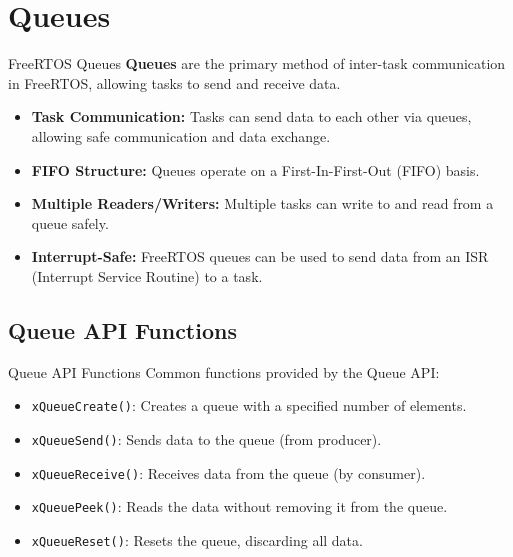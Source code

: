 \documentclass[10pt]{beamer}
\begin{document}
\section{Queues}
\begin{frame}{FreeRTOS Queues}
    \textbf{Queues} are the primary method of inter-task communication in FreeRTOS, allowing tasks to send and receive data.
    
    \begin{itemize}
        \item \textbf{Task Communication:} Tasks can send data to each other via queues, allowing safe communication and data exchange.
        \item \textbf{FIFO Structure:} Queues operate on a First-In-First-Out (FIFO) basis.
        \item \textbf{Multiple Readers/Writers:} Multiple tasks can write to and read from a queue safely.
        \item \textbf{Interrupt-Safe:} FreeRTOS queues can be used to send data from an ISR (Interrupt Service Routine) to a task.
    \end{itemize}
    
\end{frame}

\subsection{Queue API Functions}
\begin{frame}{Queue API Functions}
    Common functions provided by the Queue API:
    \begin{itemize}
        \item \texttt{xQueueCreate()}: Creates a queue with a specified number of elements.
        \item \texttt{xQueueSend()}: Sends data to the queue (from producer).
        \item \texttt{xQueueReceive()}: Receives data from the queue (by consumer).
        \item \texttt{xQueuePeek()}: Reads the data without removing it from the queue.
        \item \texttt{xQueueReset()}: Resets the queue, discarding all data.
    \end{itemize}
\end{frame}
\end{document}
